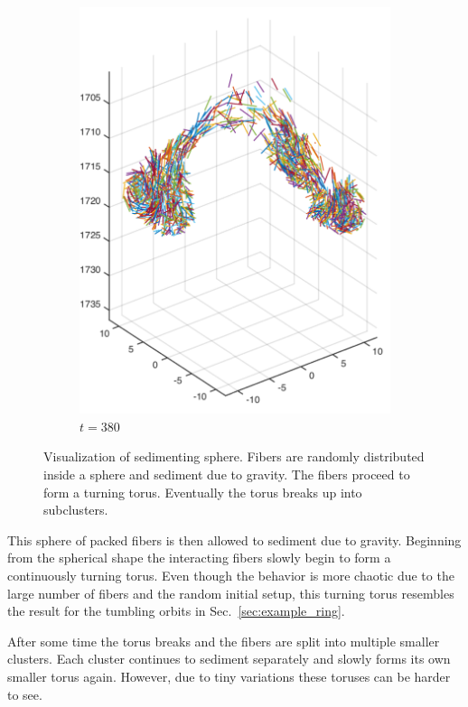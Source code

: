 \begin{figure}[!htbp]
\begin{subfigure}[h]{0.4\textwidth}
    \includegraphics[width=\textwidth]{img/state_00380.pdf}
    \caption{$t=380$}\label{fig:sphere_simulation_1d}
  \end{subfigure}
  \caption[Visualization of sedimenting sphere.]{Visualization of sedimenting sphere. Fibers are randomly distributed inside a sphere and sediment due to gravity. The fibers proceed to form a turning torus. Eventually the torus breaks up into subclusters.}
  \label{fig:sphere_simulation}
\end{figure}

This sphere of packed fibers is then allowed to sediment due to gravity. Beginning from the spherical shape the interacting fibers slowly begin to form a continuously turning torus. Even though the behavior is more chaotic due to the large number of fibers and the random initial setup, this turning torus resembles the result for the tumbling orbits in Sec.~\ref{sec:example_ring}.

After some time the torus breaks and the fibers are split into multiple smaller clusters. Each cluster continues to sediment separately and slowly forms its own smaller torus again. However, due to tiny variations these toruses can be harder to see.

